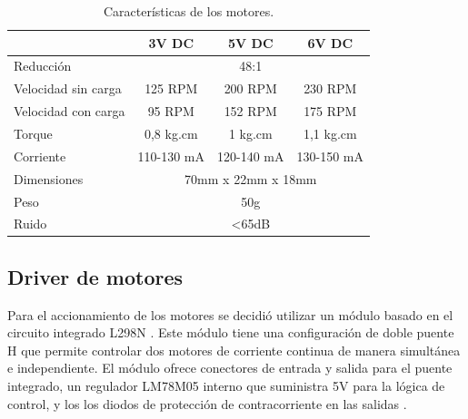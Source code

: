 \begin{table}[htpb]
\centering
\caption[características]{Características de los motores.}
\begin{tabular}{lccc}
                    & 3V DC       & 5V DC       & 6V DC      \\ \hline
Reducción           & \multicolumn{3}{c}{48:1}               \\
Velocidad sin carga & 125 RPM     & 200 RPM     & 230 RPM    \\
Velocidad con carga & 95 RPM      & 152 RPM     & 175 RPM    \\
Torque              & 0,8 kg.cm   & 1 kg.cm     & 1,1 kg.cm  \\
Corriente           & 110-130 mA  & 120-140 mA  & 130-150 mA \\
Dimensiones         & \multicolumn{3}{c}{70mm x 22mm x 18mm} \\
Peso                & \multicolumn{3}{c}{50g}                \\
Ruido               & \multicolumn{3}{c}{\textless{}65dB} 		\\  \hline
\end{tabular}
\label{tab:caracteristicas}
\end{table}


%
%





\subsection{Driver de motores}
Para el accionamiento de los motores se decidió utilizar un módulo basado en el circuito integrado L298N \citep{L298}. Este módulo tiene una configuración de doble puente H que permite  controlar dos motores de corriente continua de manera simultánea e independiente. 
El módulo ofrece conectores de entrada y salida para el puente integrado, un regulador LM78M05 interno que suministra 5V para la lógica de control, y los  los diodos de protección de contracorriente en las salidas \citep{Driver}.

